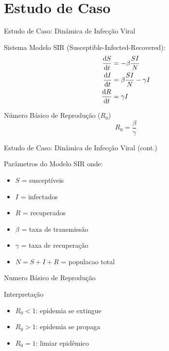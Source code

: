 \section{Estudo de Caso}

\begin{frame}[shrink=15]{Estudo de Caso: Dinâmica de Infecção Viral}
\begin{block}{Sistema}
Modelo SIR (Susceptible-Infected-Recovered):
\begin{align*}
\frac{\mathrm{d} S}{\mathrm{d} t} &= -\beta \frac{SI}{N}\\
\frac{\mathrm{d} I}{\mathrm{d} t} &= \beta \frac{SI}{N} - \gamma I\\
\frac{\mathrm{d} R}{\mathrm{d} t} &= \gamma I
\end{align*}
\end{block}

\begin{block}{Número Básico de Reprodução ($R_0$)}
\begin{equation*}
R_0 = \frac{\beta}{\gamma}
\end{equation*}
\end{block}
\end{frame}

\begin{frame}{Estudo de Caso: Dinâmica de Infecção Viral (cont.)}
\begin{block}{Parâmetros do Modelo SIR}
onde:
\begin{itemize}
    \item $S$ = susceptíveis
    \item $I$ = infectados
    \item $R$ = recuperados
    \item $\beta$ = taxa de transmissão
    \item $\gamma$ = taxa de recuperação
    \item $N = S + I + R$ = populacao total
\end{itemize}
\end{block}
\end{frame}

\begin{frame}[allowframebreaks]{Numero Básico de Reprodução}

\vspace{0.3cm}


\begin{block}{Interpretação}
\begin{itemize}
    \item $R_0 < 1$: epidemia se extingue
    \item $R_0 > 1$: epidemia se propaga
    \item $R_0 = 1$: limiar epidêmico
\end{itemize}
\end{block}

\end{frame}

